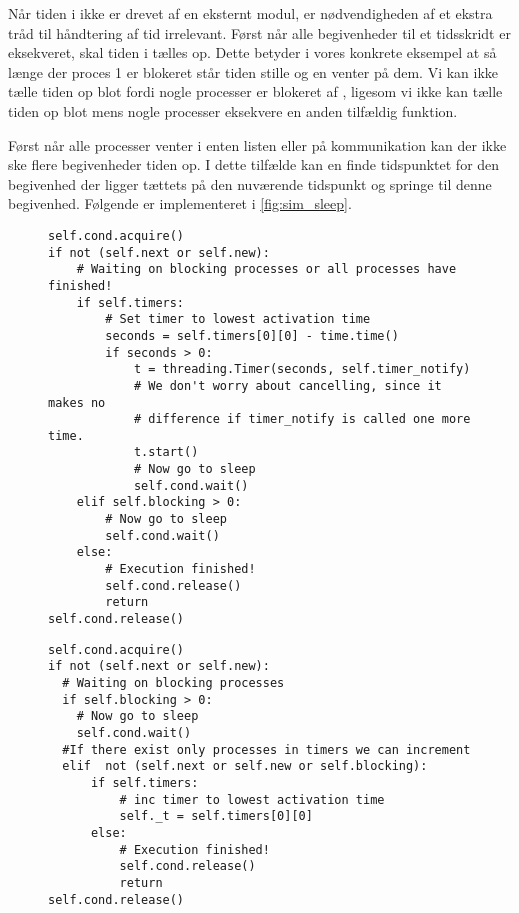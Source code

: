 Når tiden i \des ikke er drevet af en eksternt modul, er nødvendigheden af et ekstra tråd til  håndtering af tid irrelevant. Først når alle begivenheder til et tidsskridt er eksekveret, skal tiden i \des tælles op. Dette betyder i vores konkrete eksempel at  så længe der  proces 1 er blokeret står tiden stille og  \sched en venter på dem. Vi kan ikke tælle tiden op blot fordi nogle processer er blokeret af , ligesom vi ikke kan tælle tiden op blot mens nogle processer eksekvere en anden tilfældig funktion.

Først når alle processer venter i enten  listen eller på kommunikation kan der ikke ske flere begivenheder tiden op. 
I dette tilfælde  kan \sched en finde tidspunktet for den begivenhed der ligger tættets på den nuværende tidspunkt  og springe til denne begivenhed. Følgende er implementeret i \cref{fig:sim_sleep}.
\begin{figure}[hbtp]
\begin{minipage}[c]{\linewidth}
\begin{lstlisting}[firstnumber=239, label=fig:blocking_sleep, caption=Uddrag af \sched en i \code{Scheduler}]
self.cond.acquire()
if not (self.next or self.new):
    # Waiting on blocking processes or all processes have finished!
    if self.timers:
        # Set timer to lowest activation time
        seconds = self.timers[0][0] - time.time()
        if seconds > 0:
            t = threading.Timer(seconds, self.timer_notify)
            # We don't worry about cancelling, since it makes no 
            # difference if timer_notify is called one more time.
            t.start()
            # Now go to sleep
            self.cond.wait()
    elif self.blocking > 0:
        # Now go to sleep
        self.cond.wait()
    else:
        # Execution finished!
        self.cond.release()
        return
self.cond.release()
\end{lstlisting}
\end{minipage}
\begin{minipage}[c]{\linewidth}
\begin{lstlisting}[firstnumber=158, label=fig:sim_sleep, caption= uddrag af \sched en i \code{Simulation}]
self.cond.acquire()
if not (self.next or self.new):
  # Waiting on blocking processes
  if self.blocking > 0:
    # Now go to sleep
    self.cond.wait()
  #If there exist only processes in timers we can increment
  elif  not (self.next or self.new or self.blocking): 
      if self.timers:
          # inc timer to lowest activation time
          self._t = self.timers[0][0]
      else:
          # Execution finished!
          self.cond.release()
          return
self.cond.release()  
\end{lstlisting}
\end{minipage}
\end{figure}


